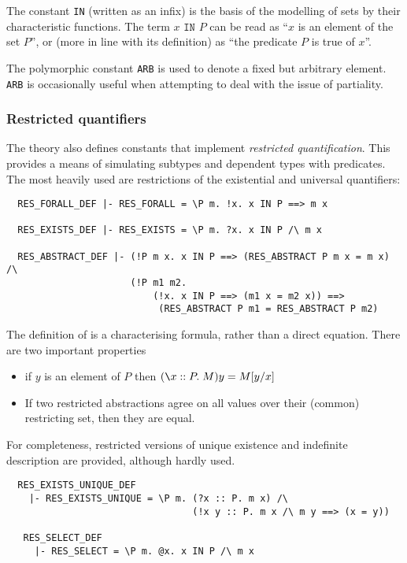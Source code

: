The constant {\small\verb+IN+} (written as an infix) is the basis of
the modelling of sets by their characteristic functions.  The term
$x\texttt{ IN }P$ can be read as ``$x$ is an element of the set
$P$'', or (more in line with its definition) as ``the predicate $P$ is
true of $x$''.

The polymorphic constant {\small\verb+ARB+} is used to denote a fixed
but arbitrary element. {\small\verb+ARB+} is occasionally useful when
attempting to deal with the issue of partiality.

\subsubsection{Restricted quantifiers}\label{res-quant}

%
The theory  also defines constants that implement
\emph{restricted quantification}. This provides a means of simulating
subtypes and dependent types with predicates. The most heavily used
are restrictions of the existential and universal quantifiers:
%
\begin{verbatim}
  RES_FORALL_DEF |- RES_FORALL = \P m. !x. x IN P ==> m x

  RES_EXISTS_DEF |- RES_EXISTS = \P m. ?x. x IN P /\ m x

  RES_ABSTRACT_DEF |- (!P m x. x IN P ==> (RES_ABSTRACT P m x = m x) /\
                      (!P m1 m2.
                          (!x. x IN P ==> (m1 x = m2 x)) ==>
                           (RES_ABSTRACT P m1 = RES_ABSTRACT P m2)
\end{verbatim}
%
The definition of  is a characterising formula, rather
than a direct equation.  There are two important properties
\begin{itemize}
\item if $y$ is an element of $P$ then $(\bs{}x :: P.\; M)
  y = M[y/x]$
\item If two restricted abstractions agree on all values over their
  (common) restricting set, then they are equal.
\end{itemize}

For completeness, restricted versions of unique existence and
indefinite description are provided, although hardly used.
\begin{verbatim}
  RES_EXISTS_UNIQUE_DEF
    |- RES_EXISTS_UNIQUE = \P m. (?x :: P. m x) /\
                                 (!x y :: P. m x /\ m y ==> (x = y))

   RES_SELECT_DEF
     |- RES_SELECT = \P m. @x. x IN P /\ m x
\end{verbatim}

